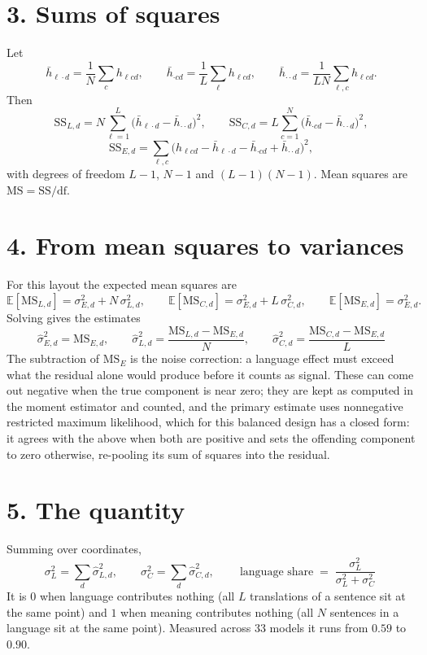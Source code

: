\documentclass[11pt]{article}
\begin{document}
\section*{3. Sums of squares}
Let
\[
\bar h_{\ell \cdot d} = \frac1N \sum_c h_{\ell c d}, \qquad
\bar h_{\cdot c d} = \frac1L \sum_\ell h_{\ell c d}, \qquad
\bar h_{\cdot \cdot d} = \frac{1}{LN} \sum_{\ell,c} h_{\ell c d} .
\]
Then
\[
\mathrm{SS}_{L,d} = N \sum_{\ell=1}^{L}
  \bigl(\bar h_{\ell \cdot d} - \bar h_{\cdot\cdot d}\bigr)^2,
\qquad
\mathrm{SS}_{C,d} = L \sum_{c=1}^{N}
  \bigl(\bar h_{\cdot c d} - \bar h_{\cdot\cdot d}\bigr)^2,
\]
\[
\mathrm{SS}_{E,d} = \sum_{\ell,c}
  \bigl(h_{\ell c d} - \bar h_{\ell \cdot d} - \bar h_{\cdot c d}
        + \bar h_{\cdot\cdot d}\bigr)^2 ,
\]
with degrees of freedom $L-1$, $N-1$ and $(L-1)(N-1)$. Mean squares are
$\mathrm{MS} = \mathrm{SS}/\mathrm{df}$.

\section*{4. From mean squares to variances}
For this layout the expected mean squares are
\[
\mathbb{E}[\mathrm{MS}_{L,d}] = \sigma^2_{E,d} + N\,\sigma^2_{L,d},
\qquad
\mathbb{E}[\mathrm{MS}_{C,d}] = \sigma^2_{E,d} + L\,\sigma^2_{C,d},
\qquad
\mathbb{E}[\mathrm{MS}_{E,d}] = \sigma^2_{E,d} .
\]
Solving gives the estimates
\[
\boxed{\;
\hat\sigma^2_{E,d} = \mathrm{MS}_{E,d}, \qquad
\hat\sigma^2_{L,d} = \frac{\mathrm{MS}_{L,d} - \mathrm{MS}_{E,d}}{N},
\qquad
\hat\sigma^2_{C,d} = \frac{\mathrm{MS}_{C,d} - \mathrm{MS}_{E,d}}{L} \; }
\]
The subtraction of $\mathrm{MS}_E$ is the noise correction: a language
effect must exceed what the residual alone would produce before it
counts as signal. These can come out negative when the true component
is near zero; they are kept as computed in the moment estimator and
counted, and the primary estimate uses nonnegative restricted maximum
likelihood, which for this balanced design has a closed form: it agrees
with the above when both are positive and sets the offending component
to zero otherwise, re-pooling its sum of squares into the residual.

\section*{5. The quantity}
Summing over coordinates,
\[
\sigma^2_L = \sum_d \hat\sigma^2_{L,d}, \qquad
\sigma^2_C = \sum_d \hat\sigma^2_{C,d}, \qquad
\boxed{\ \text{language share} \;=\;
\frac{\sigma^2_L}{\sigma^2_L + \sigma^2_C}\ }
\]
It is $0$ when language contributes nothing (all $L$ translations of a
sentence sit at the same point) and $1$ when meaning contributes
nothing (all $N$ sentences in a language sit at the same point).
Measured across 33 models it runs from $0.59$ to $0.90$.
\end{document}

